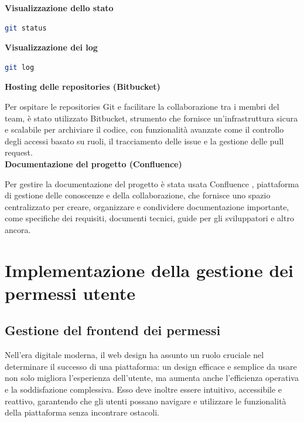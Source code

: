 \documentclass[a4paper, 12pt]{book}
\begin{document}
{\small\textbf{Visualizzazione dello stato}}
\begin{lstlisting}[language=bash]
    git status
  \end{lstlisting}

{\small\textbf{Visualizzazione dei log}}
\begin{lstlisting}[language=bash]
  git log
  \end{lstlisting}

\textbf{Hosting delle repositories (Bitbucket)}

Per ospitare le repositories Git e facilitare la collaborazione tra i membri del team, è stato utilizzato Bitbucket, strumento che fornisce
un'infrastruttura sicura e scalabile per archiviare il codice, con funzionalità avanzate come il controllo degli accessi basato su ruoli, il
tracciamento delle issue e la gestione delle pull request.\\

\textbf{Documentazione del progetto (Confluence)}

Per gestire la documentazione del progetto è stata usata Confluence \cite{Confluence}, piattaforma di gestione delle conoscenze e della collaborazione, che fornisce
uno spazio centralizzato per creare, organizzare e condividere documentazione importante, come specifiche dei requisiti, documenti tecnici,
guide per gli sviluppatori e altro ancora.



\chapter{Implementazione della gestione dei permessi utente}

\thispagestyle{empty}


\section{Gestione del frontend dei permessi}

Nell'era digitale moderna, il web design ha assunto un ruolo cruciale nel determinare il successo di una piattaforma: un
design efficace e semplice da usare non solo migliora l'esperienza dell'utente, ma aumenta anche l'efficienza operativa
e la soddisfazione complessiva. Esso deve inoltre essere intuitivo, accessibile e reattivo, garantendo che gli utenti
possano navigare e utilizzare le funzionalità della piattaforma senza incontrare ostacoli.\\
\end{document}
